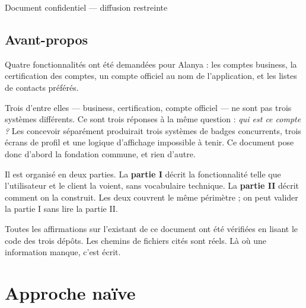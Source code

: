 \documentclass[11pt,a4paper,oneside]{report}
\begin{document}
\begin{titlepage}
\vspace{0.8cm}
\begin{center}\color{AlanyaGray}\small\sffamily
  Document confidentiel --- diffusion restreinte
\end{center}
\end{titlepage}

\chapter*{Avant-propos}
\thispagestyle{plain}

Quatre fonctionnalités ont été demandées pour Alanya : les comptes business, la
certification des comptes, un compte officiel au nom de l'application, et les listes de
contacts préférés.

Trois d'entre elles --- business, certification, compte officiel --- ne sont pas trois
systèmes différents. Ce sont trois réponses à la même question : \emph{qui est ce compte ?}
Les concevoir séparément produirait trois systèmes de badges concurrents, trois écrans de
profil et une logique d'affichage impossible à tenir. Ce document pose donc d'abord la
fondation commune, et rien d'autre.

\begin{note}
Il est organisé en deux parties. La \textbf{partie I} décrit la fonctionnalité telle que
l'utilisateur et le client la voient, sans vocabulaire technique. La \textbf{partie II}
décrit comment on la construit. Les deux couvrent le même périmètre ; on peut valider la
partie I sans lire la partie II.
\end{note}

\begin{constat}[Méthode]
Toutes les affirmations sur l'existant de ce document ont été vérifiées en lisant le code
des trois dépôts. Les chemins de fichiers cités sont réels. Là où une information manque,
c'est écrit.
\end{constat}

\tableofcontents

\part{Approche naïve}
\end{document}
